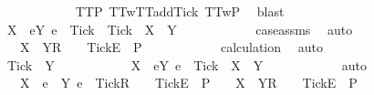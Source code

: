 \begin{isabellebody}
\ \ \ \ \ \ \ \ \ \ \isamarkupfalse%
\ TT{}{\isacharunderscore}P\ TT{}w{\isacharunderscore}TT{}{\isacharunderscore}add{\isacharunderscore}Tick\ TT{}w{\isacharunderscore}P\ \isamarkupfalse%
\ blast\isanewline
\ \ \ \ \ \ \ \ \isamarkupfalse%
\ \isamarkupfalse%
\ {\isachardoublequoteopen}X\ {\isasymunion}\ {\isacharbraceleft}e{\isasymin}Y{\isachardot}\ e\ {\isasymnoteq}\ Tick{\isacharbraceright}\ {\isasymunion}\ {\isacharbraceleft}Tick{\isacharbraceright}\ {\isacharequal}\ X\ {\isasymunion}\ Y{\isachardoublequoteclose}\isanewline
\ \ \ \ \ \ \ \ \ \ \isamarkupfalse%
\ case{\isacharunderscore}assms{}{\isacharparenleft}{}{\isacharparenright}\ \isamarkupfalse%
\ auto\isanewline
\ \ \ \ \ \ \ \ \isamarkupfalse%
\ \isamarkupfalse%
\ {\isachardoublequoteopen}{\isasymrho}\ {\isacharat}\ {\isacharbrackleft}X\ {\isasymunion}\ Y{\isacharbrackright}\isactrlsub R\ {\isacharhash}\ {\isasymsigma}{}\ {\isacharat}\ {\isacharbrackleft}{\isacharbrackleft}Tick{\isacharbrackright}\isactrlsub E{\isacharbrackright}\ {\isasymin}\ P{\isachardoublequoteclose}\isanewline
\ \ \ \ \ \ \ \ \ \ \isamarkupfalse%
\ calculation\ \isamarkupfalse%
\ auto\isanewline
\ \ \ \ \ \ \isamarkupfalse%
\isanewline
\ \ \ \ \ \ \ \ \isamarkupfalse%
\ {\isachardoublequoteopen}Tick\ {\isasymnotin}\ Y{\isachardoublequoteclose}\isanewline
\ \ \ \ \ \ \ \ \isamarkupfalse%
\ \isamarkupfalse%
\ {\isachardoublequoteopen}X\ {\isasymunion}\ {\isacharbraceleft}e{\isasymin}Y{\isachardot}\ e\ {\isasymnoteq}\ Tick{\isacharbraceright}\ {\isacharequal}\ X\ {\isasymunion}\ Y{\isachardoublequoteclose}\isanewline
\ \ \ \ \ \ \ \ \ \ \isamarkupfalse%
\ auto\isanewline
\ \ \ \ \ \ \ \ \isamarkupfalse%
\ \isamarkupfalse%
\ {\isachardoublequoteopen}{\isasymrho}\ {\isacharat}\ {\isacharbrackleft}X\ {\isasymunion}\ {\isacharbraceleft}e\ {\isasymin}\ Y{\isachardot}\ e\ {\isasymnoteq}\ Tick{\isacharbraceright}{\isacharbrackright}\isactrlsub R\ {\isacharhash}\ {\isasymsigma}{}\ {\isacharat}\ {\isacharbrackleft}{\isacharbrackleft}Tick{\isacharbrackright}\isactrlsub E{\isacharbrackright}\ {\isasymin}\ P\ {\isasymLongrightarrow}\ {\isasymrho}\ {\isacharat}\ {\isacharbrackleft}X\ {\isasymunion}\ Y{\isacharbrackright}\isactrlsub R\ {\isacharhash}\ {\isasymsigma}{}\ {\isacharat}\ {\isacharbrackleft}{\isacharbrackleft}Tick{\isacharbrackright}\isactrlsub E{\isacharbrackright}\ {\isasymin}\ P{\isachardoublequoteclose}\isanewline

\end{isabellebody}
